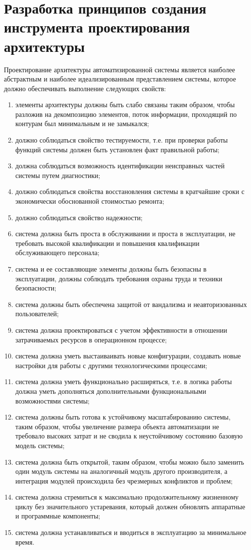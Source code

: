\chapter{Разработка принципов создания инструмента проектирования архитектуры}\label{ch:ch4}
Проектирование архитектуры автоматизированной системы является наиболее абстрактным и наиболее идеализированным представлением системы, которое должно обеспечивать выполнение следующих свойств:
\begin{enumerate}
\item элементы архитектуры должны быть слабо связаны таким образом, чтобы разложив на декомпозицию элементов, поток информации, проходящий по контурам был минимальным и не замыкался;
\item должно соблюдаться свойство тестируемости, т.е. при проверки работы функций системы должен быть установлен факт правильной работы;
\item должна соблюдаться возможность идентификации неисправных частей системы путем диагностики;
\item должно соблюдаться свойства восстановления системы в кратчайшие сроки с экономически обоснованной стоимостью ремонта;
\item должно соблюдаться свойство надежности;
\item система должна быть проста в обслуживании и проста в эксплуатации, не требовать высокой квалификации и повышения квалификации обслуживающего персонала;
\item система и ее составляющие элементы должны быть безопасны в эксплуатации, должны соблюдать требования охраны труда и техники безопасности;
\item система должны быть обеспечена защитой от вандализма и неавторизованных пользователей;
\item система должна проектироваться с учетом эффективности в отношении затрачиваемых ресурсов в  операционном процессе;
\item система должна уметь выстаиваивать новые конфигурации, создавать новые настройки для работы с другими технологическими процессами;
\item система должна уметь функционально расширяться, т.е. в логика работы должна уметь дополняться дополнительными функциональными возможностями системы;
\item система должны быть готова к устойчивому масштабированию системы, таким образом, чтобы увеличение размера объекта автоматизации не требовало высоких затрат и не сводила к неустойчивому состоянию базовую модель системы;
\item система должна быть открытой, таким образом, чтобы можно было заменить один модуль системы на аналогичный модуль другого производителя, а интеграция модулей происходила без чрезмерных конфликтов и проблем;
\item система должна стремиться к максимально продолжительному жизненному циклу без значительного устаревания, который должен обновлять аппаратные и программные компоненты;
\item система должна устанавливаться и вводиться в эксплуатацию за минимальное время.
\end{enumerate}

